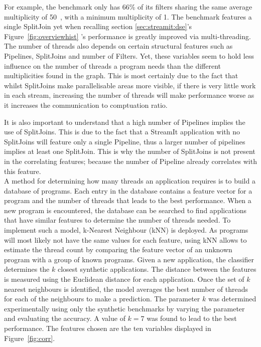 For example, the benchmark  only has 66\% of its filters sharing the same average multiplicity of 50~\cite{thiesStreamit2010}, with a minimum multiplicity of 1. 
The benchmark features a single SplitJoin yet when recalling section \ref{sec:streamit:dse}'s Figure~\ref{fig:overviewhist} 's performance is greatly improved via multi-threading.
The number of threads also depends on certain structural features such as Pipelines, SplitJoins and number of Filters.
Yet, these variables seem to hold less influence on the number of threads a program needs than the different multiplicities found in the graph.
This is most certainly due to the fact that whilst SplitJoins make parallelisable areas more visible, if there is very little work in each stream, increasing the number of threads will make performance worse as it increases the communication to comptuation ratio.

It is also important to understand that a high number of Pipelines implies the use of SplitJoins.
This is due to the fact that a StreamIt application with no SplitJoins will feature only a single Pipeline, thus a larger number of pipelines implies at least one SplitJoin.
This is why the number of SplitJoins is not present in the correlating features; because the number of Pipeline already correlates with this feature.\\

A method for determining how many threads an application requires is to build a database of programs.
Each entry in the database contains a feature vector for a program and the number of threads that leads to the best performance.
When a new program is encountered, the database can be searched to find applications that have similar features to determine the number of threads needed.
To implement such a model, k-Nearest Neighbour (kNN) is deployed.
As programs will most likely not have the same values for each feature, using kNN allows to estimate the thread count by comparing the feature vector of an unknown program with a group of known programs.
Given a new application, the classifier determines the $k$ closest synthetic applications.
The distance between the features is measured using the Euclidean distance for each application.
Once the set of $k$ nearest neighbours is identified, the model averages the best number of threads for each of the neighbours to make a prediction. 
The parameter $k$ was determined experimentally using only the synthetic benchmarks by varying the parameter and evaluating the accuracy.
A value of $k=7$ was found to lead to the best performance.
The features chosen are the ten variables displayed in Figure~\ref{fig:corr}.

